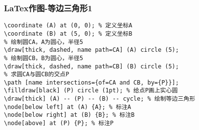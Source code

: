 \begin{frame}[fragile]
\frametitle{LaTex作图-等边三角形1}

\begin{verbatim}
\coordinate (A) at (0, 0); % 定义坐标A
\coordinate (B) at (5, 0); % 定义坐标B
% 绘制圆CA，A为圆心，半径5
\draw[thick, dashed, name path=CA] (A) circle (5); 
% 绘制圆CB，B为圆心，半径5
\draw[thick, dashed, name path=CB] (B) circle (5); 
% 求圆CA与圆CB的交点P
\path [name intersections={of=CA and CB, by={P}}]; 
\filldraw[black] (P) circle (1pt); % 给点P画上实心圆
\draw[thick] (A) -- (P) -- (B) -- cycle; % 绘制等边三角形
\node[below left] at (A) {A}; % 标注A
\node[below right] at (B) {B}; % 标注B
\node[above] at (P) {P}; % 标注P
\end{verbatim}
\end{frame}
